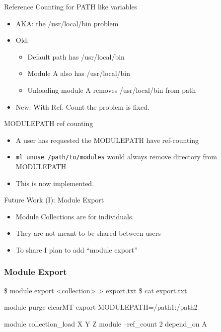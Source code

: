 \documentclass{beamer}
\begin{document}
\begin{frame}{Reference Counting for PATH like variables}
  \begin{itemize}
    \item AKA: the /usr/local/bin problem
    \item Old:
      \begin{itemize}
        \item Default path has /usr/local/bin
        \item Module A also has /usr/local/bin
        \item Unloading module A removes /usr/local/bin from path
      \end{itemize}
    \item New: With Ref. Count the problem is fixed.
  \end{itemize}
\end{frame}

\begin{frame}{MODULEPATH ref counting}
  \begin{itemize}
    \item A user has requested the MODULEPATH have ref-counting
    \item \texttt{ml unuse /path/to/modules} would always remove
      directory from MODULEPATH
    \item This is now implemented.
  \end{itemize}
\end{frame}

\begin{frame}{Future Work (I): Module Export}
  \begin{itemize}
    \item Module Collections are for individuals.
    \item They are not meant to be shared between users
    \item To share I plan to add ``module export''
  \end{itemize}
\end{frame}


\begin{frame}[fragile]
    \frametitle{Module Export}
    {\tiny
\begin{semiverbatim}
    \$ module export <collection> > export.txt
    \$ cat export.txt

    module purge
    clearMT
    export MODULEPATH=/path1:/path2
    
    module collection_load X Y Z
    module --ref_count 2 depend_on A
\end{semiverbatim}
    }
\end{frame}
\end{document}

